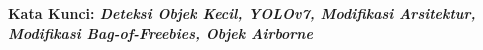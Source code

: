 \vspace{2ex}
\noindent
\textbf{Kata Kunci: \emph{Deteksi Objek Kecil, YOLOv7, Modifikasi Arsitektur, Modifikasi Bag-of-Freebies, Objek Airborne}}

%
%
%